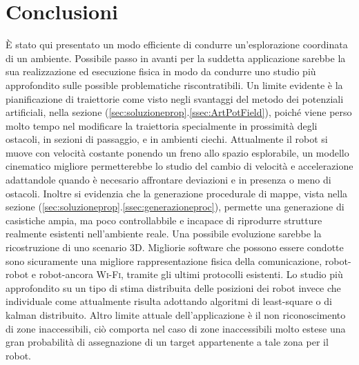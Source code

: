 \section{Conclusioni}
\label{sec:conclusioni}
È stato qui presentato un modo efficiente di condurre un'esplorazione coordinata
di un ambiente.
Possibile passo in avanti per la suddetta applicazione sarebbe la sua
realizzazione ed esecuzione fisica in modo da condurre uno studio più
approfondito sulle possible problematiche riscontratibili.
Un limite evidente è la pianificazione di traiettorie come visto negli svantaggi
del metodo dei potenziali artificiali, nella sezione
(\ref{sec:soluzioneprop}.\ref{ssec:ArtPotField}), poiché viene perso molto tempo
nel modificare la traiettoria specialmente in prossimità degli ostacoli,
in sezioni di passaggio, e in ambienti ciechi.
Attualmente il robot si muove con velocità costante ponendo un freno allo spazio
esplorabile, un modello cinematico migliore permetterebbe lo studio del cambio
di velocità e accelerazione adattandole quando è necesario affrontare
deviazioni e in presenza o meno di ostacoli.
Inoltre si evidenzia che la generazione procedurale di mappe, vista nella
sezione (\ref{sec:soluzioneprop}.\ref{ssec:generazioneproc}), permette una
generazione di casistiche ampia, ma poco controllabbile e incapace di riprodurre
strutture realmente esistenti nell'ambiente reale.
Una possibile evoluzione sarebbe la ricostruzione di uno scenario 3D.
Migliorie software che possono essere condotte sono sicuramente una migliore
rappresentazione fisica della comunicazione, robot-robot e robot-ancora
\textsc{Wi-Fi}, tramite gli ultimi protocolli esistenti.
Lo studio più approfondito su un tipo di stima distribuita delle posizioni dei
robot invece che individuale come attualmente risulta adottando algoritmi di
least-square o di kalman distribuito.
Altro limite attuale dell'applicazione è il non riconoscimento di zone
inaccessibili, ciò comporta nel caso di zone inaccessibili molto estese una gran
probabilità di assegnazione di un target appartenente a tale zona per il robot.
